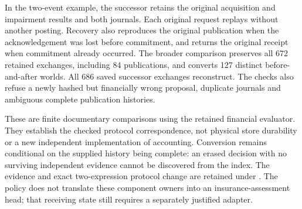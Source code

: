 In the two-event example, the successor retains the original acquisition and
impairment results and both journals. Each original request replays without
another posting. Recovery also reproduces the original publication when the
acknowledgement was lost before commitment, and returns the original receipt
when commitment already occurred. The broader comparison preserves all 672
retained exchanges, including 84 publications, and converts 127 distinct
before-and-after worlds. All 686 saved successor exchanges reconstruct. The
checks also refuse a newly hashed but financially wrong proposal, duplicate
journals and ambiguous complete publication histories.

These are finite documentary comparisons using the retained financial
evaluator. They establish the checked protocol correspondence, not physical
store durability or a new independent implementation of accounting. Conversion
remains conditional on the supplied history being complete: an erased decision
with no surviving independent evidence cannot be discovered from the index.
The evidence and exact two-expression protocol change are retained under
. The policy
does not translate these component owners into an insurance-assessment head;
that receiving state still requires a separately justified adapter.
